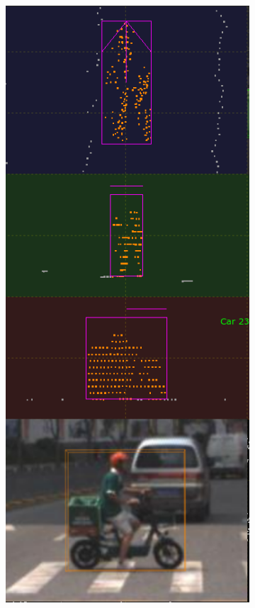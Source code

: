 \documentclass[letterpaper, 10 pt, conference]{ieeeconf}  %
\begin{document}
\begin{figure}[th]
\begin{subfigure}{0.16\linewidth}
		\includegraphics[scale=0.12]{./figures/transfer/rider-3}
		\caption{}
	\end{subfigure}
	~
	\begin{subfigure}{0.16\linewidth}

\end{subfigure}
\end{figure}
\end{document}
